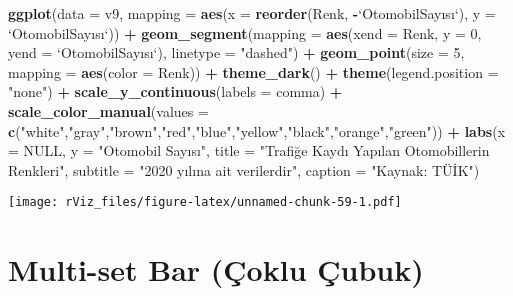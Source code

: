 \documentclass[
]{book}
\newenvironment{Shaded}{\begin{snugshade}}{\end{snugshade}}
\newcommand{\DataTypeTok}[1]{\textcolor[rgb]{0.13,0.29,0.53}{#1}}
\newcommand{\DecValTok}[1]{\textcolor[rgb]{0.00,0.00,0.81}{#1}}
\newcommand{\KeywordTok}[1]{\textcolor[rgb]{0.13,0.29,0.53}{\textbf{#1}}}
\newcommand{\NormalTok}[1]{#1}
\newcommand{\OperatorTok}[1]{\textcolor[rgb]{0.81,0.36,0.00}{\textbf{#1}}}
\newcommand{\OtherTok}[1]{\textcolor[rgb]{0.56,0.35,0.01}{#1}}
\newcommand{\StringTok}[1]{\textcolor[rgb]{0.31,0.60,0.02}{#1}}
\begin{document}
\begin{Shaded}
\begin{Highlighting}[]
\KeywordTok{ggplot}\NormalTok{(}\DataTypeTok{data =}\NormalTok{ v9, }\DataTypeTok{mapping =} \KeywordTok{aes}\NormalTok{(}\DataTypeTok{x =} \KeywordTok{reorder}\NormalTok{(Renk, }\OperatorTok{-}\StringTok{`}\DataTypeTok{OtomobilSayısı}\StringTok{`}\NormalTok{), }\DataTypeTok{y =} \StringTok{`}\DataTypeTok{OtomobilSayısı}\StringTok{`}\NormalTok{)) }\OperatorTok{+}
\StringTok{  }\KeywordTok{geom_segment}\NormalTok{(}\DataTypeTok{mapping =} \KeywordTok{aes}\NormalTok{(}\DataTypeTok{xend =}\NormalTok{ Renk, }\DataTypeTok{y =} \DecValTok{0}\NormalTok{, }\DataTypeTok{yend =} \StringTok{`}\DataTypeTok{OtomobilSayısı}\StringTok{`}\NormalTok{), }\DataTypeTok{linetype =} \StringTok{"dashed"}\NormalTok{) }\OperatorTok{+}
\StringTok{  }\KeywordTok{geom_point}\NormalTok{(}\DataTypeTok{size =} \DecValTok{5}\NormalTok{, }\DataTypeTok{mapping =} \KeywordTok{aes}\NormalTok{(}\DataTypeTok{color =}\NormalTok{ Renk)) }\OperatorTok{+}
\StringTok{  }\KeywordTok{theme_dark}\NormalTok{() }\OperatorTok{+}
\StringTok{  }\KeywordTok{theme}\NormalTok{(}\DataTypeTok{legend.position =} \StringTok{"none"}\NormalTok{) }\OperatorTok{+}
\StringTok{  }\KeywordTok{scale_y_continuous}\NormalTok{(}\DataTypeTok{labels =}\NormalTok{ comma) }\OperatorTok{+}
\StringTok{  }\KeywordTok{scale_color_manual}\NormalTok{(}\DataTypeTok{values =} \KeywordTok{c}\NormalTok{(}\StringTok{"white"}\NormalTok{,}\StringTok{"gray"}\NormalTok{,}\StringTok{"brown"}\NormalTok{,}\StringTok{"red"}\NormalTok{,}\StringTok{"blue"}\NormalTok{,}\StringTok{"yellow"}\NormalTok{,}\StringTok{"black"}\NormalTok{,}\StringTok{"orange"}\NormalTok{,}\StringTok{"green"}\NormalTok{)) }\OperatorTok{+}
\StringTok{  }\KeywordTok{labs}\NormalTok{(}\DataTypeTok{x =} \OtherTok{NULL}\NormalTok{,}
       \DataTypeTok{y =} \StringTok{"Otomobil Sayısı"}\NormalTok{,}
       \DataTypeTok{title =} \StringTok{"Trafiğe Kaydı Yapılan Otomobillerin Renkleri"}\NormalTok{,}
       \DataTypeTok{subtitle =} \StringTok{"2020 yılına ait verilerdir"}\NormalTok{,}
       \DataTypeTok{caption =} \StringTok{"Kaynak: TÜİK"}\NormalTok{)}
\end{Highlighting}
\end{Shaded}

\texttt{[image: rViz\_files/figure-latex/unnamed-chunk-59-1.pdf]}

\hypertarget{multi-set-bar-uxe7oklu-uxe7ubuk}{%
\section{Multi-set Bar (Çoklu Çubuk)}\label{multi-set-bar-uxe7oklu-uxe7ubuk}}
\end{document}
